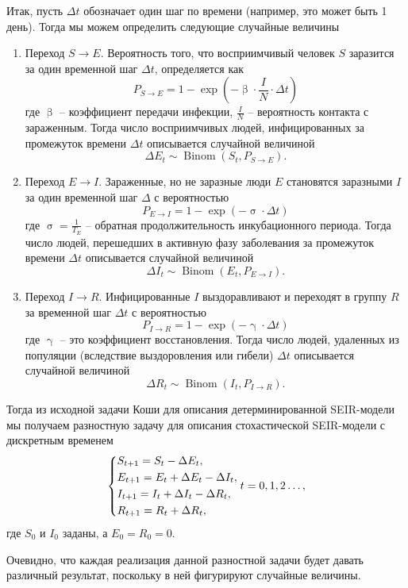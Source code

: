 \documentclass[a4paper, 14pt]{extreport}
\renewcommand{\beta}{\upbeta}
\renewcommand{\gamma}{\upgamma}
\renewcommand{\sigma}{\upsigma}
\newcommand{\Binom}{\operatorname{Binom}}
\begin{document}
	Итак, пусть $\Delta t$ обозначает один шаг по времени (например, это может быть 1 день). Тогда мы можем определить следующие случайные величины
	\begin{enumerate}
		\item Переход $S \to E$. Вероятность того, что восприимчивый человек $S$ заразится за один временной шаг $\Delta t$, определяется как
		$$
		P_{S\to E} = 1 - \exp\left(-\beta\cdot  \frac{I}{N} \cdot \Delta t\right)
		$$
		где $\beta$ -- коэффициент передачи инфекции, $\frac{I}{N}$ -- вероятность контакта с зараженным. Тогда число восприимчивых людей, инфицированных за промежуток времени $\Delta t$ описывается случайной величиной
		$$\Delta E_t \sim \Binom(S_t, P_{S\to E}).$$
		\item Переход $E \to I$. Зараженные, но не заразные люди $E$ становятся заразными $I$ за один временной шаг $\Delta$ с вероятностью
		$$
		P_{E\to I} = 1 - \exp\left(-\sigma \cdot \Delta t\right)
		$$
		где $\sigma = \frac{1}{T_E}$ -- обратная продолжительность инкубационного периода. Тогда число людей, перешедших в активную фазу заболевания за промежуток времени
		$\Delta t$ описывается случайной величиной
		$$\Delta I_t \sim \Binom(E_t, P_{E\to I}).$$
		\item Переход $I \to R$. Инфицированные $I$ выздоравливают и переходят в группу $R$ за временной шаг $\Delta t$ с вероятностью
		$$
		P_{I\to R} = 1 - \exp\left(-\gamma \cdot \Delta t\right)
		$$
		где $\gamma$ -- это коэффициент восстановления. Тогда число людей, удаленных из популяции (вследствие выздоровления
		или гибели)
		$\Delta t$ описывается случайной величиной
		$$\Delta R_t \sim \Binom(I_t, P_{I\to R}).$$
	\end{enumerate}
	Тогда из исходной задачи Коши для описания детерминированной SEIR-модели мы получаем разностную задачу для описания стохастической SEIR-модели с дискретным временем
	\begin{equation}
		\begin{dcases}
			S_{t+1} = S_t - \Delta E_t,\\
			E_{t+1} = E_t +\Delta E_t - \Delta I_t,\\
			I_{t+1} = I_t + \Delta I_t - \Delta R_t,\\
			R_{t+1} = R_t + \Delta R_t,
		\end{dcases}
		t = 0,1,2\ldots,
	\end{equation}
	где $S_0$ и $I_0$ заданы, а $E_0 = R_0 = 0$.
	
	Очевидно, что каждая реализация данной разностной задачи будет давать различный результат, поскольку в ней фигурируют случайные величины. 
\end{document}
